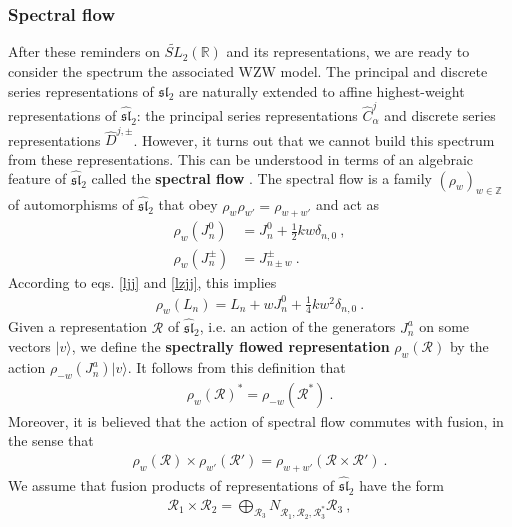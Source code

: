 \documentclass[12pt, a4paper, notitlepage, twoside]{report}
\numberwithin{equation}{section}
\theoremstyle{break}
\begin{document}
\subsubsection{Spectral flow}

After these reminders on $\widetilde{SL}_2(\mathbb{R})$ and its representations, we are ready to consider the spectrum the associated WZW model.
The principal and discrete series representations of $\mathfrak{sl}_2$ are naturally extended to affine highest-weight representations of $\widehat{\mathfrak{sl}}_2$: the principal series representations $\hat{C}^j_\alpha$ and discrete series representations $\hat{D}^{j,\pm}$.
However, it turns out that we cannot build this spectrum from these representations.
This can be understood in terms of an algebraic feature of $\widehat{\mathfrak{sl}}_2$ called the \textbf{\boldmath spectral flow} \cite{mo00a}.
The spectral flow is a family $(\rho_w)_{w\in{\mathbb{Z}}}$ of automorphisms of $\widehat{\mathfrak{sl}}_2$ that obey $\rho_w\rho_{w'}=\rho_{w+w'}$ and act as 
\begin{align}
 \rho_w(J^0_n)&=  J^0_n + \frac12 kw \delta_{n,0}   \ ,
\\
 \rho_w(J^\pm_n) &= J^\pm_{n\pm w}  \ .
\end{align}
According to eqs. \eqref{ljj} and \eqref{lzjj}, this implies
\begin{align}
 \rho_w(L_n)  = L_n + wJ^0_n +\frac14 kw^2 \delta_{n,0}\ .
\end{align}
Given a representation $\mathcal{R}$ of $\widehat{\mathfrak{sl}}_2$, i.e. an action of the generators $J^a_n$ on some vectors $|v\rangle$, we define the \textbf{\boldmath spectrally flowed representation} $\rho_w(\mathcal{R})$ by the action $\rho_{-w}(J^a_n)|v\rangle$.  
It follows from this definition that 
\begin{align}
 \rho_w(\mathcal{R})^* = \rho_{-w}(\mathcal{R}^*)\ .
\end{align}
Moreover, it is believed that the action of spectral flow commutes with fusion, in the sense that \cite{gab01b}
\begin{align}
 \rho_{w}(\mathcal{R})\times \rho_{w'}(\mathcal{R}') = \rho_{w+w'}(\mathcal{R}\times \mathcal{R}')\ .
\label{rwr}
\end{align}
We assume that fusion products of representations of $\widehat{\mathfrak{sl}}_2$ have the form 
\begin{align}
 \mathcal{R}_1\times \mathcal{R}_2 = \bigoplus_{\mathcal{R}_3} N_{\mathcal{R}_1,\mathcal{R}_2,\mathcal{R}_3^*} \mathcal{R}_3\ ,
\end{align}
\end{document}
